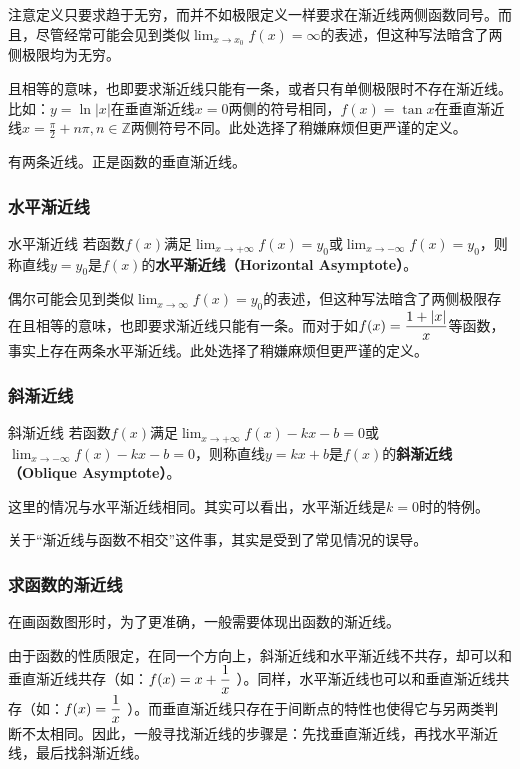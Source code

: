 注意定义只要求趋于无穷，而并不如极限定义一样要求在渐近线两侧函数同号。而且，尽管经常可能会见到类似$\displaystyle \lim_{x\to x_0}f(x)=\infty$的表述，但这种写法暗含了两侧极限均为无穷。


且相等的意味，也即要求渐近线只能有一条，或者只有单侧极限时不存在渐近线。比如：$y=\ln |x|$在垂直渐近线$x=0$两侧的符号相同，$f(x)=\tan x$在垂直渐近线$\displaystyle x = \frac{\pi}{2} + n\pi,n \in \mathbb{Z}$两侧符号不同。此处选择了稍嫌麻烦但更严谨的定义。

有两条近线。正是函数的垂直渐近线。

\subsubsection{水平渐近线}

\begin{definition}{水平渐近线}
若函数$f(x)$满足$\displaystyle \lim_{x\to +\infty}f(x)=y_0$或$\displaystyle \lim_{x\to -\infty}f(x)=y_0$，则称直线$y=y_0$是$f(x)$的\textbf{水平渐近线（Horizontal Asymptote）}。
\end{definition}

偶尔可能会见到类似$\displaystyle \lim_{x\to \infty}f(x)=y_0$的表述，但这种写法暗含了两侧极限存在且相等的意味，也即要求渐近线只能有一条。而对于如$\displaystyle f(x)={1+|x|\over x}$等函数，事实上存在两条水平渐近线。此处选择了稍嫌麻烦但更严谨的定义。

\subsubsection{斜渐近线}

\begin{definition}{斜渐近线}
若函数$f(x)$满足$\displaystyle \lim_{x\to +\infty}f(x)-kx-b=0$或$\displaystyle \lim_{x\to -\infty}f(x)-kx-b=0$，则称直线$y=kx+b$是$f(x)$的\textbf{斜渐近线（Oblique Asymptote）}。
\end{definition}

这里的情况与水平渐近线相同。其实可以看出，水平渐近线是$k=0$时的特例。

关于“渐近线与函数不相交”这件事，其实是受到了常见情况的误导。

\subsubsection{求函数的渐近线}

在画函数图形时，为了更准确，一般需要体现出函数的渐近线。

由于函数的性质限定，在同一个方向上，斜渐近线和水平渐近线不共存，却可以和垂直渐近线共存（如：$\displaystyle f(x)=x+{1\over x}$ ）。同样，水平渐近线也可以和垂直渐近线共存（如：$\displaystyle f(x)={1\over x}$ ）。而垂直渐近线只存在于间断点的特性也使得它与另两类判断不太相同。因此，一般寻找渐近线的步骤是：先找垂直渐近线，再找水平渐近线，最后找斜渐近线。

